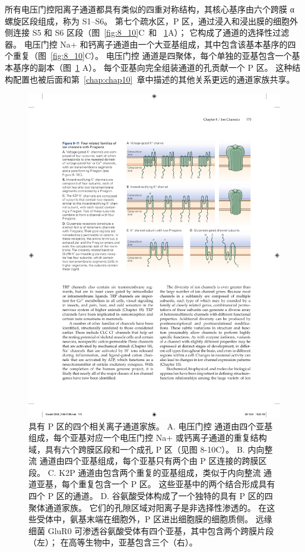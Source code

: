 所有电压门控阳离子通道都具有类似的四重对称结构，其核心基序由六个跨膜 α 螺旋区段组成，称为 S1–S6。
第七个疏水区，P 区，通过浸入和浸出膜的细胞外侧连接 S5 和 S6 区段（图~\ref{fig:8_10}C~和 ~\ref{fig:8_11}A）；
它构成了通道的选择性过滤器。
电压门控 Na+ 和钙离子通道由一个大亚基组成，其中包含该基本基序的四个重复（图~\ref{fig:8_10}C）。 
电压门控  通道是四聚体，每个单独的亚基包含一个基本基序的副本（图~\ref{fig:8_11} A）。
每个亚基向完全组装通道的孔贡献一个 P 区。
这种结构配置也被后面和第~\ref{chap:chap10}~章中描述的其他关系更远的通道家族共享。


\begin{figure}[htbp]
	\centering
	\includegraphics[width=0.7\linewidth]{chap08/fig_8_11}
	\caption{具有 P 区的四个相关离子通道家族。 A. 电压门控  通道由四个亚基组成，每个亚基对应一个电压门控 Na+ 或钙离子通道的重复结构域，具有六个跨膜区段和一个成孔 P 区（见图 8-10C）。 B. 内向整流  通道由四个亚基组成，每个亚基只有两个由 P 区连接的跨膜区段。 C. K2P  通道由包含两个重复的亚基组成，类似于内向整流  通道亚基，每个重复包含一个 P 区。 这些亚基中的两个结合形成具有四个 P 区的通道。 D. 谷氨酸受体构成了一个独特的具有 P 区的四聚体通道家族。 它们的孔隙区域对阳离子是非选择性渗透的。 在这些受体中，氨基末端在细胞外，P 区进出细胞膜的细胞质侧。 远缘细菌 GluR0  可渗透谷氨酸受体有四个亚基，其中包含两个跨膜片段（左）； 在高等生物中，亚基包含三个（右）。}
	\label{fig:8_11}
\end{figure}


